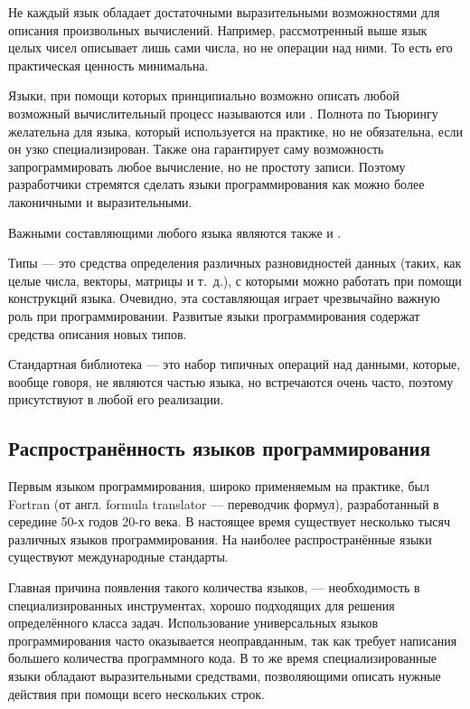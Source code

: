 Не каждый язык обладает достаточными выразительными возможностями для
описания произвольных вычислений. Например, рассмотренный выше язык
целых чисел описывает лишь сами числа, но не операции над ними. То
есть его практическая ценность минимальна.

Языки, при помощи которых принципиально возможно описать любой
возможный вычислительный процесс называются  или
. Полнота по Тьюрингу
желательна для языка, который используется на практике, но не
обязательна, если он узко специализирован. Также она гарантирует саму
возможность запрограммировать любое вычисление, но не простоту записи.
Поэтому разработчики стремятся сделать языки программирования как
можно более лаконичными и выразительными.

Важными составляющими любого языка являются также
 и
.

Типы — это средства определения различных разновидностей данных
(таких, как целые числа, векторы, матрицы и т.~д.), с которыми можно
работать при помощи конструкций языка. Очевидно, эта составляющая
играет чрезвычайно важную роль при программировании. Развитые языки
программирования содержат средства описания новых типов.

Стандартная библиотека — это набор типичных операций над данными,
которые, вообще говоря, не являются частью языка, но встречаются очень
часто, поэтому присутствуют в любой его реализации.

\subsection{Распространённость языков программирования}

Первым языком программирования, широко применяемым на практике, был
Fortran (от англ. formula translator — переводчик формул),
разработанный в середине 50-х годов 20-го века. В настоящее время
существует несколько тысяч различных языков программирования. На
наиболее распространённые языки существуют международные
стандарты.

Главная причина появления такого количества языков, — необходимость в
специализированных инструментах, хорошо подходящих для решения
определённого класса задач.  Использование универсальных языков
программирования часто оказывается неоправданным, так как требует
написания большего количества программного кода. В то же время
специализированные языки обладают выразительными средствами,
позволяющими описать нужные действия при помощи всего нескольких
строк.

